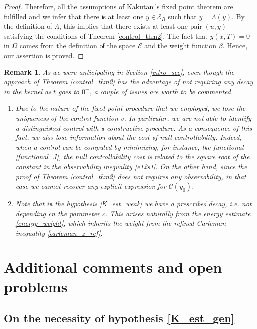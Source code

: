 \documentclass{amsart}    %
\newtheorem{remark}{\bf Remark}[section]
\begin{document}
\begin{proof}
Therefore, all the assumptions of Kakutani's fixed point theorem are fulfilled and we infer that there is at least one $y\in \mathcal E_R$ such that $y=\Lambda(y)$. By the definition of $\Lambda$, this implies that there exists at least one pair $(u,y)$ satisfying the
conditions of Theorem \ref{control_thm2}. The fact that $y(x,T) = 0$ in $\Omega$ comes from the definition of the space $\mathcal E$ and the weight function $\beta$. Hence, our assertion is proved.	
\end{proof}

\begin{remark}
As we were anticipating in Section \ref{intro_sec}, even though the approach of Theorem \ref{control_thm2} has the advantage of not requiring any decay in the kernel as $t$ goes to $0^+$, a couple of issues are worth to be commented. 
\begin{enumerate}
	\item Due to the nature of the fixed point procedure that we employed, we lose the uniqueness of the control function $v$. In particular, we are not able to identify a distinguished control with a constructive procedure. As a consequence of this fact, we also lose information about the cost of null controllability. Indeed, when a control can be computed by minimizing, for instance, the functional \eqref{functional_J}, the null controllability cost is related to the square root of the constant in the observability inequality \eqref{e12s1}. On the other hand, since the proof of Theorem \ref{control_thm2} does not requires any observability, in that case we cannot recover any explicit expression for $\mathcal C(y_0)$.
	
	\item Note that in the hypothesis \eqref{K_est_weak} we have a prescribed decay, i.e. not depending on the parameter $\varepsilon$. This arises naturally from the energy estimate \eqref{energy_weight}, which inherits the weight from the refined Carleman inequality \eqref{carleman_z_ref}.
\end{enumerate}
\end{remark}	


\section{Additional comments and open problems}\label{comments_sec}

\subsection{On the necessity of hypothesis \eqref{K_est_gen}}
\end{document}
